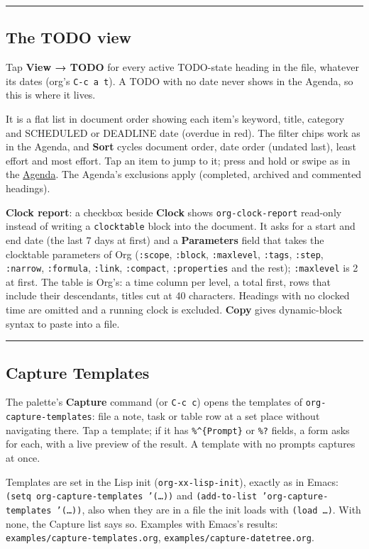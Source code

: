 \documentclass[11pt]{article}
\begin{document}
\noindent\rule{\textwidth}{0.5pt}

\subsection{The TODO view}
\label{sec:org0699f8b}
Tap \textbf{View → TODO} for every active TODO-state heading in the file, whatever its dates (org's \texttt{C-c a t}). A TODO with no date never shows in the Agenda, so this is where it lives.

It is a flat list in document order showing each item's keyword, title, category and SCHEDULED or DEADLINE date (overdue in red). The filter chips work as in the Agenda, and \textbf{Sort} cycles document order, date order (undated last), least effort and most effort. Tap an item to jump to it; press and hold or swipe as in the \hyperref[sec:org38ac5a3]{Agenda}. The Agenda's exclusions apply (completed, archived and commented headings).

\textbf{Clock report}: a checkbox beside \textbf{Clock} shows \texttt{org-clock-report} read-only instead of writing a \texttt{clocktable} block into the document. It asks for a start and end date (the last 7 days at first) and a \textbf{Parameters} field that takes the clocktable parameters of Org (\texttt{:scope}, \texttt{:block}, \texttt{:maxlevel}, \texttt{:tags}, \texttt{:step}, \texttt{:narrow}, \texttt{:formula}, \texttt{:link}, \texttt{:compact}, \texttt{:properties} and the rest); \texttt{:maxlevel} is 2 at first. The table is Org's: a time column per level, a total first, rows that include their descendants, titles cut at 40 characters. Headings with no clocked time are omitted and a running clock is excluded. \textbf{Copy} gives dynamic-block syntax to paste into a file.

\noindent\rule{\textwidth}{0.5pt}

\subsection{Capture Templates}
\label{sec:org0116725}
The palette's \textbf{Capture} command (or \texttt{C-c c}) opens the templates of \texttt{org-capture-templates}: file a note, task or table row at a set place without navigating there. Tap a template; if it has \texttt{\%\textasciicircum{}\{Prompt\}} or \texttt{\%?} fields, a form asks for each, with a live preview of the result. A template with no prompts captures at once.

Templates are set in the Lisp init (\texttt{org-xx-lisp-init}), exactly as in Emacs: \texttt{(setq org-capture-templates '(…))} and \texttt{(add-to-list 'org-capture-templates '(…))}, also when they are in a file the init loads with \texttt{(load …)}. With none, the Capture list says so. Examples with Emacs's results: \texttt{examples/capture-templates.org}, \texttt{examples/capture-datetree.org}.
\end{document}
